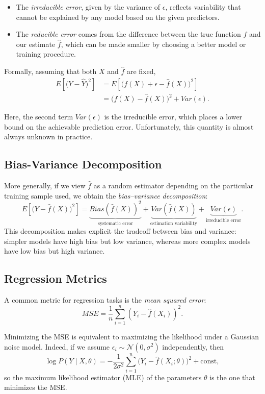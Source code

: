 \begin{itemize}
    \item The \emph{irreducible error}, given by the variance of $\epsilon$, reflects variability that cannot be explained by any model based on the given predictors.
    \item The \emph{reducible error} comes from the difference between the true function $f$ and our estimate $\hat{f}$, which can be made smaller by choosing a better model or training procedure.
\end{itemize}

Formally, assuming that both $X$ and $\hat{f}$ are fixed,
\[
\begin{aligned}
E\!\left[\big(Y-\hat{Y}\big)^{2}\right] 
&= E\!\left[\big(f(X)+\epsilon - \hat{f}(X)\big)^{2}\right] \\
&= \big(f(X)-\hat{f}(X)\big)^{2} + Var(\epsilon).
\end{aligned}
\]

Here, the second term $Var(\epsilon)$ is the irreducible error, which places a lower bound on the achievable prediction error. Unfortunately, this quantity is almost always unknown in practice.

\subsection{Bias-Variance Decomposition}

More generally, if we view $\hat{f}$ as a random estimator depending on the particular training sample used, we obtain the \emph{bias–variance decomposition}:
\[
E\!\left[\big(Y-\hat{f}(X)\big)^{2}\right] 
= \underbrace{Bias\!\left(\hat{f}(X)\right)^{2}}_{\text{systematic error}}
+ \underbrace{Var\!\left(\hat{f}(X)\right)}_{\text{estimation variability}}
+ \underbrace{Var(\epsilon)}_{\text{irreducible error}}.
\]
This decomposition makes explicit the tradeoff between bias and variance: simpler models have high bias but low variance, whereas more complex models have low bias but high variance.

\subsection{Regression Metrics}

A common metric for regression tasks is the \emph{mean squared error}:
\[
MSE = \frac{1}{n} \sum_{i=1}^n \left( Y_i - \hat{f}(X_i) \right)^2.
\]

Minimizing the MSE is equivalent to maximizing the likelihood under a Gaussian noise model. Indeed, if we assume $\epsilon_i \sim \mathcal{N}(0,\sigma^2)$ independently, then
\[
\log P(Y\mid X,\theta) = -\frac{1}{2\sigma^2}\sum_{i=1}^n \big(Y_i-\hat{f}(X_i;\theta)\big)^2 + \text{const},
\]
so the maximum likelihood estimator (MLE) of the parameters $\theta$ is the one that minimizes the MSE.

